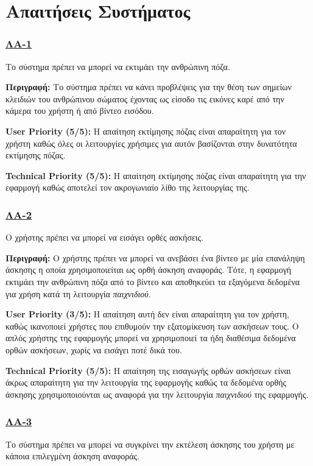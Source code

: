 \section{Απαιτήσεις Συστήματος}
\label{section:pose_system_requirements}

\subsubsection{\underline{ΛΑ-1}}
\noindent Το σύστημα πρέπει να μπορεί να εκτιμάει την ανθρώπινη πόζα.

\noindent\textbf{Περιγραφή:} Το σύστημα πρέπει να κάνει προβλέψεις για την θέση των σημείων κλειδιών του ανθρώπινου σώματος έχοντας ως είσοδο τις εικόνες καρέ από την κάμερα του χρήστη ή από βίντεο εισόδου.

\noindent\textbf{User Priority (5/5):} Η απαίτηση εκτίμησης πόζας είναι απαραίτητη για τον χρήστη καθώς όλες οι λειτουργίες χρήσιμες για αυτόν βασίζονται στην δυνατότητα εκτίμησης πόζας.

\noindent\textbf{Technical Priority (5/5):} Η απαίτηση εκτίμησης πόζας είναι απαραίτητη για την εφαρμογή καθώς αποτελεί τον ακρογωνιαίο λίθο της λειτουργίας της.

\subsubsection{\underline{ΛΑ-2}}
\noindent Ο χρήστης πρέπει να μπορεί να εισάγει ορθές ασκήσεις.

\noindent\textbf{Περιγραφή:} Ο χρήστης πρέπει να μπορεί να ανεβάσει ένα βίντεο με μία επανάληψη άσκησης η οποία χρησιμοποιείται ως ορθή άσκηση αναφοράς. Τότε, η εφαρμογή εκτιμάει την ανθρώπινη πόζα από το βίντεο και αποθηκεύει τα εξαγόμενα δεδομένα για χρήση κατά τη λειτουργία \textsl{παιχνιδιού}.

\noindent\textbf{User Priority (3/5):} Η απαίτηση αυτή δεν είναι απαραίτητη για τον χρήστη, καθώς ικανοποιεί χρήστες που επιθυμούν την εξατομίκευση των ασκήσεων τους. Ο απλός χρήστης της εφαρμογής μπορεί να χρησιμοποιεί τα ήδη διαθέσιμα δεδομένα ορθών ασκήσεων, χωρίς να εισάγει ποτέ δικά του.

\noindent\textbf{Technical Priority (5/5):} Η απαίτηση της εισαγωγής ορθών ασκήσεων είναι άκρως απαραίτητη για την λειτουργία της εφαρμογής καθώς τα δεδομένα ορθής άσκησης χρησιμοποιούνται ως αναφορά για την λειτουργία \textsl{παιχνιδιού} της εφαρμογής.

\subsubsection{\underline{ΛΑ-3}}
\noindent Το σύστημα πρέπει να μπορεί να συγκρίνει την εκτέλεση άσκησης του χρήστη με κάποια επιλεγμένη άσκηση αναφοράς.

